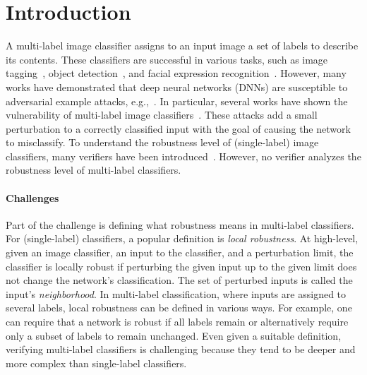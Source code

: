 
\section{Introduction}

A multi-label image classifier assigns to an input image a set of labels to describe its contents.
These classifiers are successful in various tasks, such as image tagging~\cite{IMAGETAGGING}, object detection~\cite{ObjectDetection}, and facial expression recognition~\cite{FacialRec}.
However, many works have demonstrated that deep neural networks (DNNs) are susceptible to adversarial example attacks, e.g.,~\cite{ref7,ref15,szegedy2014intriguing,ref17,ref29,ref56}. In particular, several works have shown the vulnerability of multi-label image classifiers~\cite{MultiVul1, MultiVul2, MultiVul3}.
These attacks add a small perturbation to a correctly classified input with the goal of causing the network to misclassify.
To understand the robustness level of (single-label) image classifiers, many verifiers have been introduced~\cite{MIPVERIFY, INCOMPLETE1, INCOMPLETE2, COMPLETE, ABSTRACTINTER}.
However, no verifier analyzes the robustness level of multi-label classifiers. %

\paragraph{Challenges} Part of the challenge is defining what robustness means in multi-label classifiers.
For (single-label) classifiers, a popular definition is \emph{local robustness}.
At high-level, given an image classifier, an input to the classifier, and a perturbation limit, the classifier is locally robust if perturbing the given input up to the given limit does not change the network's classification.
The set of perturbed inputs is called the input's \emph{neighborhood}.
In multi-label classification, where inputs are assigned to several labels, local robustness can be defined in various ways. For example, one can require that a network is robust if all labels remain or alternatively require only a subset of labels to remain unchanged.
Even given a suitable definition, verifying multi-label classifiers is challenging because they tend to be deeper and more complex than single-label classifiers.

